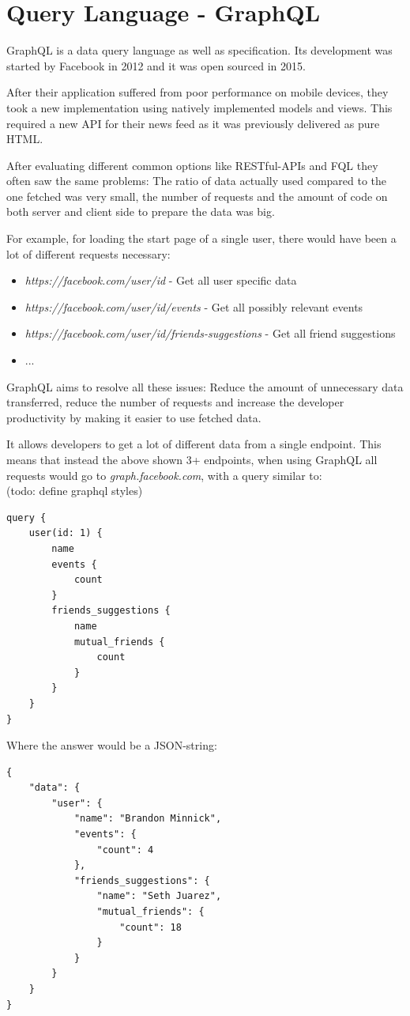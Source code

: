 \section{Query Language - GraphQL}
GraphQL is a data query language as well as specification. Its development was started by Facebook in 2012 and it was open sourced in 2015. \cite{GraphQLFoundation}

After their application suffered from poor performance on mobile devices, they took a new implementation using natively implemented models and views. This required a new API for their news feed as it was previously delivered as pure HTML. \cite{EngineeringFB}

After evaluating different common options like RESTful-APIs and FQL they often saw the same problems:  The ratio of data actually used compared to the one fetched was very small, the number of requests \cite{GraphQLIntro} and the amount of code on both server and client side to prepare the data was big. \cite{EngineeringFB}

For example, for loading the start page of a single user, there would have been a lot of different requests necessary:
\begin{itemize}
\item \emph{https://facebook.com/user/id} - Get all user specific data
\item \emph{https://facebook.com/user/id/events} - Get all possibly relevant events
\item \emph{https://facebook.com/user/id/friends-suggestions} - Get all friend suggestions
\item ...
\end{itemize} \cite{GraphQLIntro}

GraphQL aims to resolve all these issues: Reduce the amount of unnecessary data transferred, reduce the number of requests and increase the developer productivity by making it easier to use fetched data. \cite{EngineeringFB}

It allows developers to get a lot of different data from a single endpoint. This means that instead the above shown 3+ endpoints, when using GraphQL all requests would go to \emph{graph.facebook.com}, with a query similar to:\\ (todo: define graphql styles)
\newpage
\lstset{language=GraphQL}
\begin{lstlisting}[caption={A GraphQL Query},label={ex211}]
query {
	user(id: 1) {
		name
		events {
			count
		}
		friends_suggestions {
			name
			mutual_friends {
				count
			}
		}
	}
}
\end{lstlisting}
\citep[with adaptions]{GraphQLIntro}	
Where the answer would be a JSON-string:
\begin{lstlisting}[caption={Example Response Data},label={ex212}]
{ 
	"data": {
		"user": {
			"name": "Brandon Minnick",
			"events": {
				"count": 4
			},
			"friends_suggestions": {
				"name": "Seth Juarez",
				"mutual_friends": {
					"count": 18 
				}
			}
		}
	}
}
\end{lstlisting}
\citep[with adaptions]{GraphQLIntro}	

